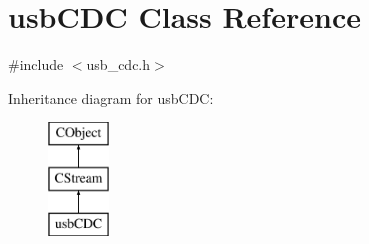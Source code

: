 \hypertarget{classusb_c_d_c}{\section{usb\-C\-D\-C Class Reference}
\label{classusb_c_d_c}
}


{\ttfamily \#include $<$usb\-\_\-cdc.\-h$>$}

Inheritance diagram for usb\-C\-D\-C\-:\begin{figure}[H]
\begin{center}
\leavevmode
\includegraphics[height=3.000000cm]{d6/dc5/classusb_c_d_c}
\end{center}
\end{figure}
